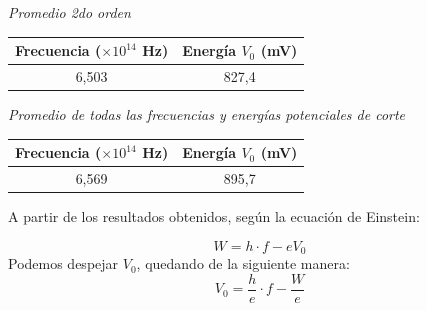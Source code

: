 \documentclass[a4paper]{article}
\begin{document}
      \newpage
      \noindent
      \thispagestyle{fancy}

      \begin{minipage}[c]{7.5cm}
        \vspace{5mm}
        \centering
        \textit{Promedio 2do orden} 
        \vspace{2mm}
      \end{minipage}
      
      \begin{center}
        \begin{tabular}{ c c }
          \toprule
           Frecuencia ($\times 10^{14}$ Hz) & Energía $V_{0}$ (mV) \\
            \midrule
            6,503 & 827,4 \\
          \bottomrule
        \end{tabular}
      \end{center}

      \vspace{5mm}
      
      \begin{minipage}[c]{7.5cm}
        \vspace{5mm}
        \centering
        \textit{Promedio de todas las frecuencias y energías potenciales de corte} 
        \vspace{2mm}
      \end{minipage}
     
      \begin{center}
        \begin{tabular}{ c c }
          \toprule
           Frecuencia ($\times 10^{14}$ Hz) & Energía $V_{0}$ (mV) \\
            \midrule
             6,569 & 895,7 \\
          \bottomrule
        \end{tabular}
      \end{center}
      \vspace{5mm}

      \indent A partir de los resultados obtenidos, según la ecuación de Einstein:
      
      \begin{equation}
        W = h \cdot f - eV_{0}
      \end{equation}
      \indent Podemos despejar $V_{0}$, quedando de la siguiente manera:
      \begin{equation}
        V_{0} = \frac{h}{e} \cdot f - \frac{W}{e}
      \end{equation}
\end{document}
